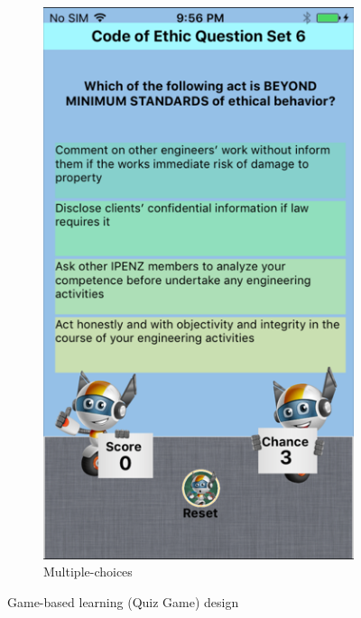 \begin{figure}[!hbt]
\begin{subfigure}{0.27\textwidth}
\includegraphics[width=\textwidth]{game3}
\caption{Multiple-choices}
    \end{subfigure}\hspace{0.05\textwidth}
  \caption{Game-based learning (Quiz Game) design}
\end{figure}
\newpage 
